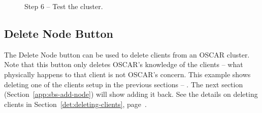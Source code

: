 \begin{figure}[h!]
\begin{center}
{      }
    \caption{Step 6 -- Test the cluster.}
    \label{fig:sbs-setup-test}
  \end{center}
\end{figure}



\subsection{Delete Node Button}
\label{app:sbs-delete-node}

The Delete Node button can be used to delete clients from an OSCAR
cluster.  Note that this button only deletes OSCAR's knowledge of the
clients -- what physically happens to that client is not OSCAR's
concern.  This example shows deleting one of the clients setup in the
previous sections -- .  The next section
(Section~\ref{app:sbs-add-node}) will show adding it back.  See the
details on deleting clients in Section~\ref{det:deleting-clients},
page~\pageref{det:deleting-clients}.

